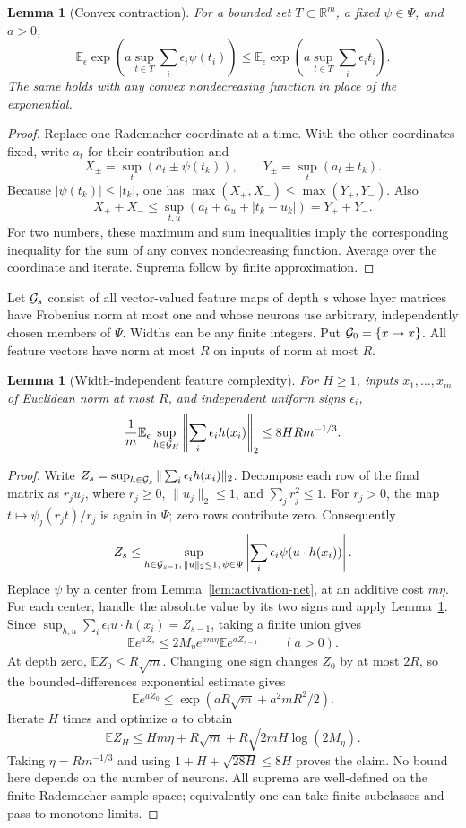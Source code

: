 \documentclass[11pt]{article}
\newtheorem{lemma}[theorem]{Lemma}
\theoremstyle{remark}\newtheorem{remark}[theorem]{Remark}
\newcommand{\R}{\mathbb R}\newcommand{\E}{\mathbb E}\newcommand{\Prb}{\mathbb P}
\begin{document}
\begin{lemma}[Convex contraction]\label{lem:contraction}
For a bounded set $T\subset\R^m$, a fixed $\psi\in\Psi$, and $a>0$,
\[
 \E_\epsilon\exp\left(a\sup_{t\in T}\sum_i\epsilon_i\psi(t_i)\right)
 \le \E_\epsilon\exp\left(a\sup_{t\in T}\sum_i\epsilon_i t_i\right).
\]
The same holds with any convex nondecreasing function in place of the exponential.
\end{lemma}
\begin{proof}
Replace one Rademacher coordinate at a time. With the other coordinates fixed, write $a_t$ for their contribution and
\[
 X_\pm=\sup_t(a_t\pm\psi(t_k)),\qquad Y_\pm=\sup_t(a_t\pm t_k).
\]
Because $|\psi(t_k)|\le|t_k|$, one has $\max(X_+,X_-)\le\max(Y_+,Y_-)$. Also
\[
 X_++X_-\le\sup_{t,u}(a_t+a_u+|t_k-u_k|)=Y_++Y_-.
\]
For two numbers, these maximum and sum inequalities imply the corresponding inequality for the sum of any convex nondecreasing function. Average over the coordinate and iterate. Suprema follow by finite approximation.
\end{proof}

Let $\mathcal G_s$ consist of all vector-valued feature maps of depth $s$ whose layer matrices have Frobenius norm at most one and whose neurons use arbitrary, independently chosen members of $\Psi$. Widths can be any finite integers. Put $\mathcal G_0=\{x\mapsto x\}$. All feature vectors have norm at most $R$ on inputs of norm at most $R$.

\begin{lemma}[Width-independent feature complexity]\label{lem:feature-rad}
For $H\ge1$, inputs $x_1,\ldots,x_m$ of Euclidean norm at most $R$, and independent uniform signs $\epsilon_i$,
\[
 \frac1m\E_\epsilon\sup_{h\in\cG_H}
 \left\|\sum_i\epsilon_i h(x_i)\right\|_2
 \le8HRm^{-1/3}.
\]
\end{lemma}
\begin{proof}
Write $Z_s=\sup_{h\in\mathcal G_s}\|\sum_i\epsilon_i h(x_i)\|_2$. Decompose each row of the final matrix as $r_j u_j$, where $r_j\ge0$, $\|u_j\|_2\le1$, and $\sum_jr_j^2\le1$. For $r_j>0$, the map $t\mapsto\psi_j(r_jt)/r_j$ is again in $\Psi$; zero rows contribute zero. Consequently
\[
 Z_s\le\sup_{h\in\mathcal G_{s-1},\,\|u\|_2\le1,\,\psi\in\Psi}
 \left|\sum_i\epsilon_i\psi(u\cdot h(x_i))\right|.
\]
Replace $\psi$ by a center from Lemma~\ref{lem:activation-net}, at an additive cost $m\eta$. For each center, handle the absolute value by its two signs and apply Lemma~\ref{lem:contraction}. Since $\sup_{h,u}\sum_i\epsilon_i u\cdot h(x_i)=Z_{s-1}$, taking a finite union gives
\[
 \E e^{aZ_s}\le2M_\eta e^{am\eta}\E e^{aZ_{s-1}}\qquad(a>0).
\]
At depth zero, $\E Z_0\le R\sqrt m$. Changing one sign changes $Z_0$ by at most $2R$, so the bounded-differences exponential estimate gives
\[
 \E e^{aZ_0}\le\exp(aR\sqrt m+a^2mR^2/2).
\]
Iterate $H$ times and optimize $a$ to obtain
\[
 \E Z_H\le Hm\eta+R\sqrt m+R\sqrt{2mH\log(2M_\eta)}.
\]
Taking $\eta=Rm^{-1/3}$ and using $1+H+\sqrt{28H}\le8H$ proves the claim. No bound here depends on the number of neurons. All suprema are well-defined on the finite Rademacher sample space; equivalently one can take finite subclasses and pass to monotone limits.
\end{proof}
\end{document}
